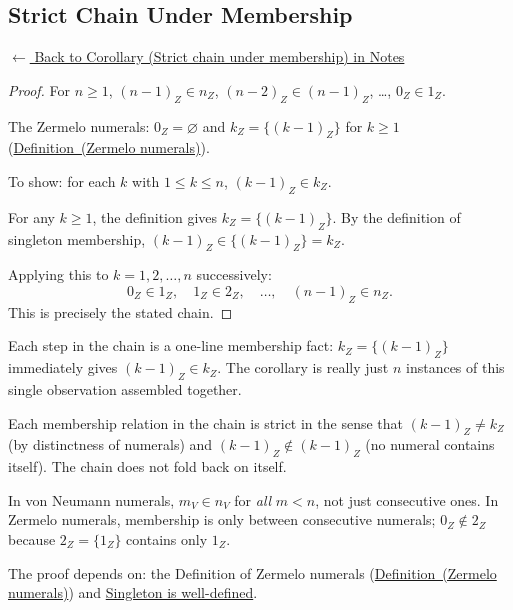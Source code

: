
\subsection*{Strict Chain Under Membership}
\label{prf:zermelo-chain}

\begin{remark*}[Return]
\hyperref[cor:zermelo-chain]{$\leftarrow$ Back to Corollary (Strict chain under membership) in Notes}
\end{remark*}

\begin{proof}
\Claim For $n \geq 1$, $(n-1)_Z \in n_Z$, $(n-2)_Z \in (n-1)_Z$, \ldots, $0_Z \in 1_Z$.

\Given The Zermelo numerals: $0_Z = \varnothing$ and $k_Z = \{(k-1)_Z\}$ for
$k \geq 1$ (\hyperref[def:zermelo-numerals]{Definition~(Zermelo numerals)}).

\Goal To show: for each $k$ with $1 \leq k \leq n$, $(k-1)_Z \in k_Z$.

\Strategy For any $k \geq 1$, the definition gives $k_Z = \{(k-1)_Z\}$. By the
definition of singleton membership, $(k-1)_Z \in \{(k-1)_Z\} = k_Z$.

Applying this to $k = 1, 2, \ldots, n$ successively:
\[
0_Z \in 1_Z,\quad 1_Z \in 2_Z,\quad \ldots,\quad (n-1)_Z \in n_Z.
\]
This is precisely the stated chain. \AsReq
\end{proof}

\begin{remark*}
Each step in the chain is a one-line membership fact: $k_Z = \{(k-1)_Z\}$
immediately gives $(k-1)_Z \in k_Z$. The corollary is really just $n$ instances
of this single observation assembled together.
\end{remark*}

\begin{remark*}
Each membership relation in the chain is strict in the sense that $(k-1)_Z \neq
k_Z$ (by distinctness of numerals) and $(k-1)_Z \notin (k-1)_Z$ (no numeral
contains itself). The chain does not fold back on itself.
\end{remark*}

\begin{remark*}
In von Neumann numerals, $m_V \in n_V$ for \emph{all} $m < n$, not just
consecutive ones. In Zermelo numerals, membership is only between consecutive
numerals; $0_Z \notin 2_Z$ because $2_Z = \{1_Z\}$ contains only $1_Z$.
\end{remark*}

\begin{remark*}[Dependencies]
The proof depends on: the Definition of Zermelo numerals
(\hyperref[def:zermelo-numerals]{Definition~(Zermelo numerals)}) and
\hyperref[prop:singleton-well-defined]{Singleton is well-defined}.
\end{remark*}
